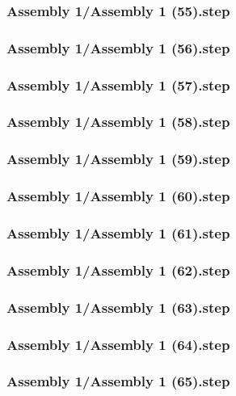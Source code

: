 \documentclass[a4paper,12pt]{article}
\begin{document}
\subsubsection{Assembly 1/Assembly 1 (55).step}

\subsubsection{Assembly 1/Assembly 1 (56).step}

\subsubsection{Assembly 1/Assembly 1 (57).step}

\subsubsection{Assembly 1/Assembly 1 (58).step}

\subsubsection{Assembly 1/Assembly 1 (59).step}

\subsubsection{Assembly 1/Assembly 1 (60).step}

\subsubsection{Assembly 1/Assembly 1 (61).step}

\subsubsection{Assembly 1/Assembly 1 (62).step}

\subsubsection{Assembly 1/Assembly 1 (63).step}

\subsubsection{Assembly 1/Assembly 1 (64).step}

\subsubsection{Assembly 1/Assembly 1 (65).step}

\end{document}
